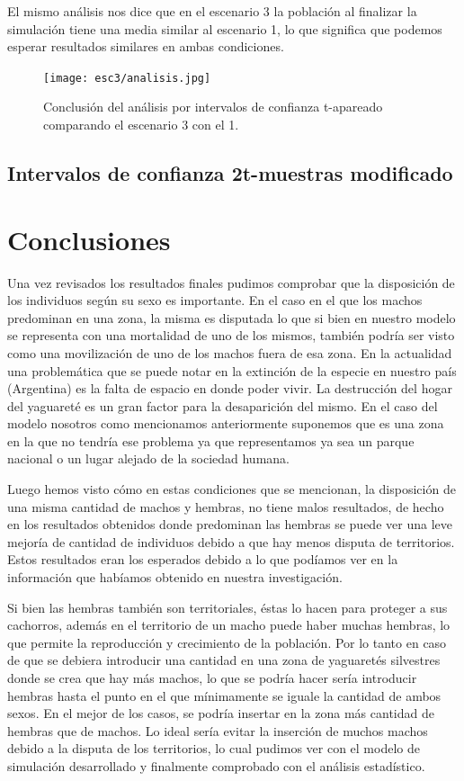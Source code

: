             El mismo análisis nos dice que en el escenario 3 la población al finalizar la simulación tiene una media
            similar al escenario 1, lo que significa que podemos esperar resultados similares en ambas condiciones.

            \begin{figure}[htbp]
                \centering
                \texttt{[image: esc3/analisis.jpg]}
                \caption{Conclusión del análisis por intervalos de confianza t-apareado comparando el escenario 3 con el 1.}
                \label{fig:fig1}
            \end{figure}

        \subsection{Intervalos de confianza 2t-muestras modificado}
            
\section{Conclusiones}
  Una vez revisados los resultados finales pudimos comprobar que la disposición de los individuos según su sexo es importante. En el caso en el que los machos predominan en una zona, la misma es disputada lo que si bien en nuestro modelo se representa con una mortalidad de uno de los mismos, también podría ser visto como una movilización de uno de los machos fuera de esa zona. En la actualidad una problemática que se puede notar en la extinción de la especie en nuestro país (Argentina) es la falta de espacio en donde poder vivir. La destrucción del hogar del yaguareté es un gran factor para la desaparición del mismo. En el caso del modelo nosotros como mencionamos anteriormente suponemos que es una zona en la que no tendría ese problema ya que representamos ya sea un parque nacional o un lugar alejado de la sociedad humana.

  Luego hemos visto cómo en estas condiciones que se mencionan, la disposición de una misma cantidad de machos y hembras, no tiene malos resultados, de hecho en los resultados obtenidos donde predominan las hembras se puede ver una leve mejoría de cantidad de individuos debido a que hay menos disputa de territorios. Estos resultados eran los esperados debido a lo que podíamos ver en la información que habíamos obtenido en nuestra investigación.

  Si bien las hembras también son territoriales, éstas lo hacen para proteger a sus cachorros, además en el territorio de un macho puede haber muchas hembras, lo que permite la reproducción y crecimiento de la población. Por lo tanto en caso de que se debiera introducir una cantidad en una zona de yaguaretés silvestres donde se crea que hay más machos, lo que se podría hacer sería introducir hembras hasta el punto en el que mínimamente se iguale la cantidad de ambos sexos. En el mejor de los casos, se podría insertar en la zona más cantidad de hembras que de machos. Lo ideal sería evitar la inserción de muchos machos debido a la disputa de los territorios, lo cual pudimos ver con el modelo de simulación desarrollado y finalmente comprobado con el análisis estadístico.